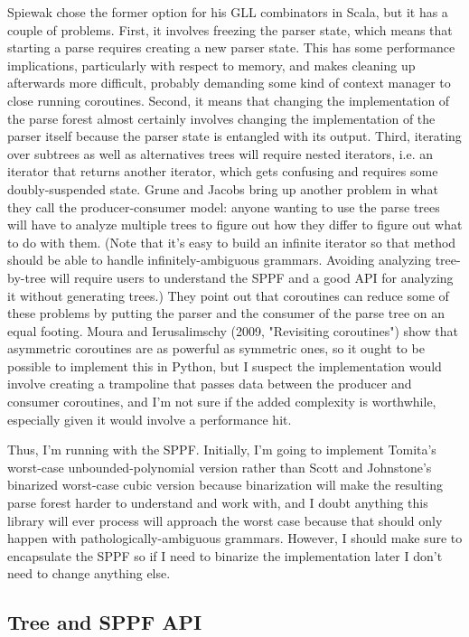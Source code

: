 \documentclass[12pt]{article}
\begin{document}
Spiewak chose the former option for his GLL combinators in Scala, but
it has a couple of problems.  First, it involves freezing the parser
state, which means that starting a parse requires creating a new
parser state.  This has some performance implications, particularly
with respect to memory, and makes cleaning up afterwards more
difficult, probably demanding some kind of context manager to close
running coroutines.  Second, it means that changing the implementation
of the parse forest almost certainly involves changing the
implementation of the parser itself because the parser state is
entangled with its output.  Third, iterating over subtrees as well as
alternatives trees will require nested iterators, i.e. an iterator
that returns another iterator, which gets confusing and requires some
doubly-suspended state.  Grune and Jacobs bring up another problem in
what they call the producer-consumer model: anyone wanting to use the
parse trees will have to analyze multiple trees to figure out how they
differ to figure out what to do with them.  (Note that it's easy to
build an infinite iterator so that method should be able to handle
infinitely-ambiguous grammars.  Avoiding analyzing tree-by-tree will
require users to understand the SPPF and a good API for analyzing it
without generating trees.)  They point out that coroutines can reduce
some of these problems by putting the parser and the consumer of the
parse tree on an equal footing.  Moura and Ierusalimschy (2009,
"Revisiting coroutines") show that asymmetric coroutines are as
powerful as symmetric ones, so it ought to be possible to implement
this in Python, but I suspect the implementation would involve
creating a trampoline that passes data between the producer and
consumer coroutines, and I'm not sure if the added complexity is
worthwhile, especially given it would involve a performance hit.

Thus, I'm running with the SPPF.  Initially, I'm going to implement
Tomita's worst-case unbounded-polynomial version rather than Scott and
Johnstone's binarized worst-case cubic version because binarization
will make the resulting parse forest harder to understand and work
with, and I doubt anything this library will ever process will
approach the worst case because that should only happen with
pathologically-ambiguous grammars.  However, I should make sure to
encapsulate the SPPF so if I need to binarize the implementation later
I don't need to change anything else.


\subsection{Tree and SPPF API}
\label{sec:tree_sppf_api}
\end{document}
